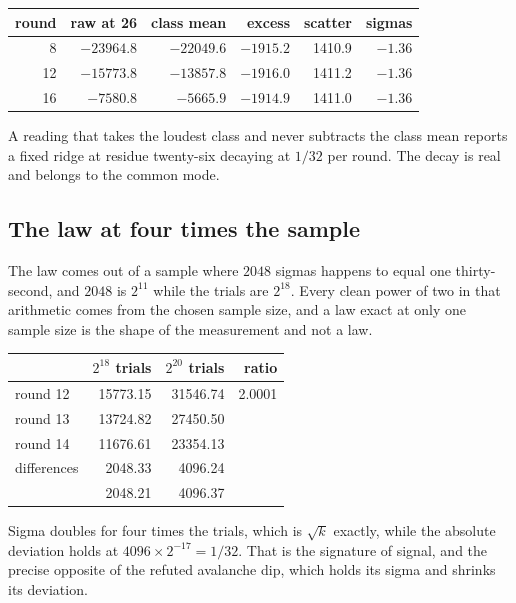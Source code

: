 \begin{center}
\begin{tabular}{rrrrrr}
\toprule
round & raw at 26 & class mean & excess & scatter & sigmas \\
\midrule
8 & \(-23964.8\) & \(-22049.6\) & \(-1915.2\) & 1410.9 & \(-1.36\) \\
12 & \(-15773.8\) & \(-13857.8\) & \(-1916.0\) & 1411.2 & \(-1.36\) \\
16 & \(-7580.8\) & \(-5665.9\) & \(-1914.9\) & 1411.0 & \(-1.36\) \\
\bottomrule
\end{tabular}
\end{center}

A reading that takes the loudest class and never subtracts the class mean reports a fixed ridge at residue twenty-six decaying at \(1/32\) per round. The decay is real and belongs to the common mode.

\subsection{The law at four times the sample}

The law comes out of a sample where \(2048\) sigmas happens to equal one thirty-second, and \(2048\) is \(2^{11}\) while the trials are \(2^{18}\). Every clean power of two in that arithmetic comes from the chosen sample size, and a law exact at only one sample size is the shape of the measurement and not a law.

\begin{center}
\begin{tabular}{lrrr}
\toprule
 & \(2^{18}\) trials & \(2^{20}\) trials & ratio \\
\midrule
round 12 & 15773.15 & 31546.74 & 2.0001 \\
round 13 & 13724.82 & 27450.50 & \\
round 14 & 11676.61 & 23354.13 & \\
\midrule
differences & 2048.33 & 4096.24 & \\
 & 2048.21 & 4096.37 & \\
\bottomrule
\end{tabular}
\end{center}

Sigma doubles for four times the trials, which is \(\sqrt{k}\) exactly, while the absolute deviation holds at \(4096 \times 2^{-17} = 1/32\). That is the signature of signal, and the precise opposite of the refuted avalanche dip, which holds its sigma and shrinks its deviation.

